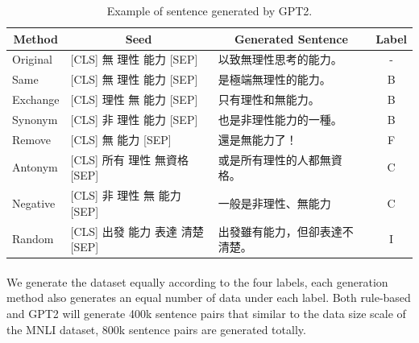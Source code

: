 \documentclass{article}
\begin{document}
\begin{CJK*}{UTF8}{bkai}
\begin{table}
  \centering
  \begin{tabular}{|l|l|l|c|}
  \hline
  \multicolumn{1}{|c|}{Method} & \multicolumn{1}{c|}{Seed} & \multicolumn{1}{c|}{Generated Sentence} & Label \\ \hline
  Original & {[}CLS{]} 無 理性 能力 {[}SEP{]} & 以致無理性思考的能力。 & - \\ \hline
  Same & {[}CLS{]} 無 理性 能力 {[}SEP{]} & 是極端無理性的能力。 & B \\ \hline
  Exchange & {[}CLS{]} 理性 無 能力 {[}SEP{]} & 只有理性和無能力。 & B \\ \hline
  Synonym & {[}CLS{]} 非 理性 能力 {[}SEP{]} & 也是非理性能力的一種。 & B \\ \hline
  Remove & {[}CLS{]} 無 能力 {[}SEP{]} & 還是無能力了！ & F \\ \hline
  Antonym & {[}CLS{]} 所有 理性 無資格 {[}SEP{]} & 或是所有理性的人都無資格。 & C \\ \hline
  Negative & {[}CLS{]} 非 理性 無 能力 {[}SEP{]} & 一般是非理性、無能力 & C \\ \hline
  Random & {[}CLS{]} 出發 能力 表達 清楚 {[}SEP{]} & 出發雖有能力，但卻表達不清楚。 & I \\ \hline
  \end{tabular}
  \caption{Example of sentence generated by GPT2.}
  \label{example:gpt2_pseudo}
\end{table}

\paragraph{}
We generate the dataset equally according to the four labels, each generation method also generates an equal number of data under each label. Both rule-based and GPT2 will generate 400k sentence pairs that similar to the data size scale of the MNLI dataset, 800k sentence pairs are generated totally.


\end{CJK*}
\end{document}
